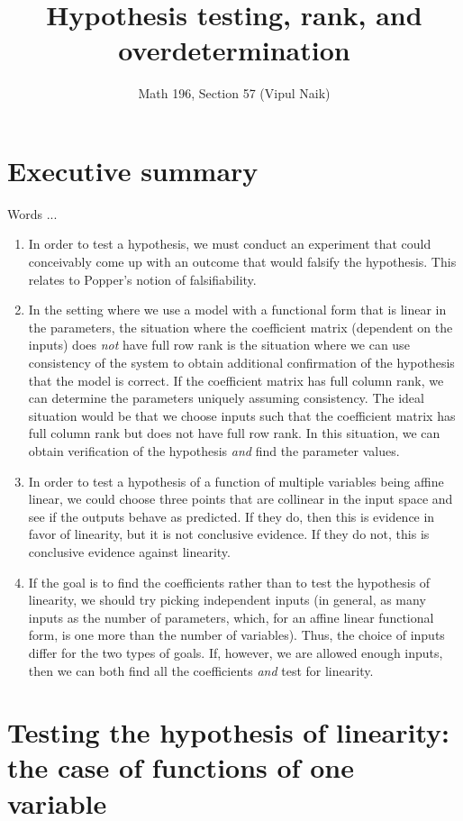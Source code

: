 \documentclass[10pt]{amsart}
\title{Hypothesis testing, rank, and overdetermination}
\author{Math 196, Section 57 (Vipul Naik)}
\begin{document}
\maketitle

\section*{Executive summary}

Words ...

\begin{enumerate}
\item In order to test a hypothesis, we must conduct an experiment
  that could conceivably come up with an outcome that would falsify
  the hypothesis. This relates to Popper's notion of falsifiability.
\item In the setting where we use a model with a functional form that
  is linear in the parameters, the situation where the coefficient
  matrix (dependent on the inputs) does {\em not} have full row rank
  is the situation where we can use consistency of the system to
  obtain additional confirmation of the hypothesis that the model is
  correct. If the coefficient matrix has full column rank, we can
  determine the parameters uniquely assuming consistency. The ideal
  situation would be that we choose inputs such that the coefficient
  matrix has full column rank but does not have full row rank. In this
  situation, we can obtain verification of the hypothesis {\em and}
  find the parameter values.
\item In order to test a hypothesis of a function of multiple
  variables being affine linear, we could choose three points that are
  collinear in the input space and see if the outputs behave as
  predicted. If they do, then this is evidence in favor of linearity,
  but it is not conclusive evidence. If they do not, this is
  conclusive evidence against linearity.
\item If the goal is to find the coefficients rather than to test the
  hypothesis of linearity, we should try picking independent inputs
  (in general, as many inputs as the number of parameters, which, for
  an affine linear functional form, is one more than the number of
  variables). Thus, the choice of inputs differ for the two types of
  goals. If, however, we are allowed enough inputs, then we can both
  find all the coefficients {\em and} test for linearity.
\end{enumerate}
\section{Testing the hypothesis of linearity: the case of functions of one variable}
\end{document}
